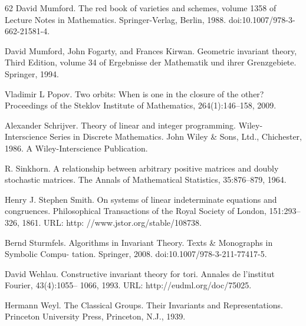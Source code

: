 \begin{thebibliography}{62}
David Mumford. The red book of varieties and schemes, volume 1358 of Lecture Notes in Mathematics. Springer-Verlag, Berlin, 1988. doi:10.1007/978-3-662-21581-4.

David Mumford, John Fogarty, and Frances Kirwan. Geometric invariant theory, Third Edition, volume 34 of Ergebnisse der Mathematik und ihrer Grenzgebiete. Springer, 1994.

Vladimir L Popov. Two orbits: When is one in the closure of the other? Proceedings of the Steklov Institute of Mathematics, 264(1):146–158, 2009.

Alexander Schrijver. Theory of linear and integer programming. Wiley-Interscience Series in Discrete Mathematics. John Wiley \& Sons, Ltd., Chichester, 1986. A Wiley-Interscience Publication.

R. Sinkhorn. A relationship between arbitrary positive matrices and doubly stochastic matrices. The Annals of Mathematical Statistics, 35:876–879, 1964.

Henry J. Stephen Smith. On systems of linear indeterminate equations and congruences. Philosophical Transactions of the Royal Society of London, 151:293–326, 1861. URL: http: //www.jstor.org/stable/108738.

Bernd Sturmfels. Algorithms in Invariant Theory. Texts \& Monographs in Symbolic Compu- tation. Springer, 2008. doi:10.1007/978-3-211-77417-5.

David Wehlau. Constructive invariant theory for tori. Annales de l’institut Fourier, 43(4):1055– 1066, 1993. URL: http://eudml.org/doc/75025.

Hermann Weyl. The Classical Groups. Their Invariants and Representations. Princeton University Press, Princeton, N.J., 1939.
\end{thebibliography}
